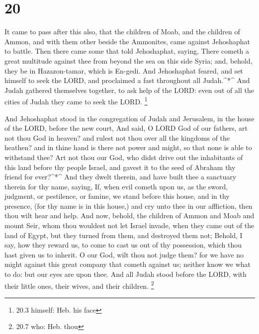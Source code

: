 \hypertarget{section-19}{%
\section{20}\label{section-19}}

 It came to pass after this also, that the children of Moab,
and the children of Ammon, and with them other beside the Ammonites,
came against Jehoshaphat to battle.  Then there came some
that told Jehoshaphat, saying, There cometh a great multitude against
thee from beyond the sea on this side Syria; and, behold, they be in
Hazazon-tamar, which is En-gedi.  And Jehoshaphat feared,
and set himself to seek the LORD, and proclaimed a fast throughout all
Judah.\^{}*\^{}  And Judah gathered themselves together, to
ask help of the LORD: even out of all the cities of Judah they came to
seek the LORD. \footnote{20.3 himself: Heb. his face}

 And Jehoshaphat stood in the congregation of Judah and
Jerusalem, in the house of the LORD, before the new court, 
And said, O LORD God of our fathers, art not thou God in heaven? and
rulest not thou over all the kingdoms of the heathen? and in thine hand
is there not power and might, so that none is able to withstand thee?
 Art not thou our God, who didst drive out the inhabitants
of this land before thy people Israel, and gavest it to the seed of
Abraham thy friend for ever?\^{}*\^{}  And they dwelt
therein, and have built thee a sanctuary therein for thy name, saying,
 If, when evil cometh upon us, as the sword, judgment, or
pestilence, or famine, we stand before this house, and in thy presence,
(for thy name is in this house,) and cry unto thee in our affliction,
then thou wilt hear and help.  And now, behold, the
children of Ammon and Moab and mount Seir, whom thou wouldest not let
Israel invade, when they came out of the land of Egypt, but they turned
from them, and destroyed them not;  Behold, I say, how they
reward us, to come to cast us out of thy possession, which thou hast
given us to inherit.  O our God, wilt thou not judge them?
for we have no might against this great company that cometh against us;
neither know we what to do: but our eyes are upon thee. 
And all Judah stood before the LORD, with their little ones, their
wives, and their children. \footnote{20.7 who: Heb. thou}

